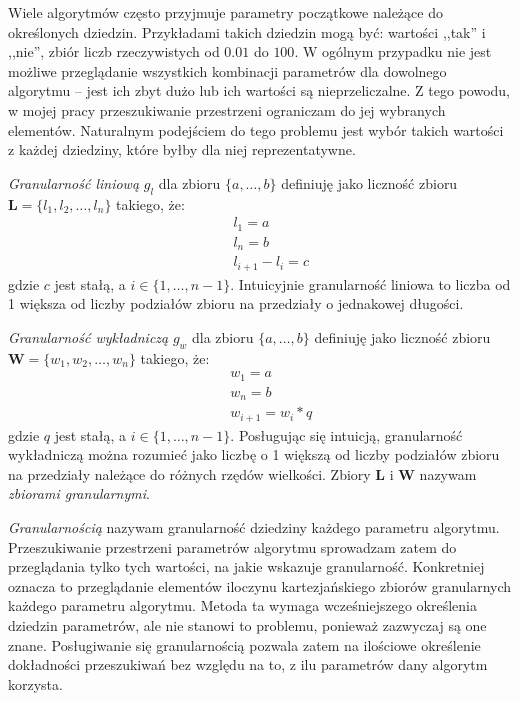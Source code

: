 \documentclass[../thesis.tex]{subfiles}
\begin{document}
Wiele algorytmów często przyjmuje parametry początkowe należące do określonych dziedzin. Przykładami takich dziedzin mogą być: wartości ,,tak'' i ,,nie'', zbiór liczb rzeczywistych od $0.01$ do $100$. W ogólnym przypadku nie jest możliwe przeglądanie wszystkich kombinacji parametrów dla dowolnego algorytmu -- jest ich zbyt dużo lub ich wartości są nieprzeliczalne. Z tego powodu, w mojej pracy przeszukiwanie przestrzeni ograniczam do jej wybranych elementów. Naturalnym podejściem do tego problemu jest wybór takich wartości z każdej dziedziny, które byłby dla niej reprezentatywne. 

\textit{Granularność liniową} $g_l$ dla zbioru $\{a, \ldots, b\}$ definiuję jako liczność zbioru $\textbf{L} = \{l_1, l_2, \ldots, l_n\}$ takiego, że:
\begin{eqnarray*}
&& l_1 = a \\
&& l_n = b \\
&& l_{i+1} - l_i = c
\end{eqnarray*}
gdzie $c$ jest stałą, a $i \in \{1, \ldots, n-1\}$. Intuicyjnie granularność liniowa to liczba od 1 większa od liczby podziałów zbioru na przedziały o jednakowej długości.

\textit{Granularność wykładniczą} $g_w$ dla zbioru $\{a, \ldots, b\}$ definiuję jako liczność zbioru $\textbf{W} = \{w_1, w_2, \ldots, w_n\}$ takiego, że:
\begin{eqnarray*}
&& w_1 = a \\
&& w_n = b \\
&& w_{i+1} = w_i * q
\end{eqnarray*}
gdzie $q$ jest stałą, a $i \in \{1, \ldots, n-1\}$. Posługując się intuicją, granularność wykładniczą można rozumieć jako liczbę o 1 większą od liczby podziałów zbioru na przedziały należące do różnych rzędów wielkości. Zbiory $\textbf{L}$ i $\textbf{W}$ nazywam \textit{zbiorami granularnymi}.

\textit{Granularnością} nazywam granularność dziedziny każdego parametru algorytmu. Przeszukiwanie przestrzeni parametrów algorytmu sprowadzam zatem do przeglądania tylko tych wartości, na jakie wskazuje granularność. Konkretniej oznacza to przeglądanie elementów iloczynu kartezjańskiego zbiorów granularnych każdego parametru algorytmu. Metoda ta wymaga wcześniejszego określenia dziedzin parametrów, ale nie stanowi to problemu, ponieważ zazwyczaj są one znane. Posługiwanie się granularnością pozwala zatem na ilościowe określenie dokładności przeszukiwań bez względu na to, z ilu parametrów dany algorytm korzysta. 
\end{document}
